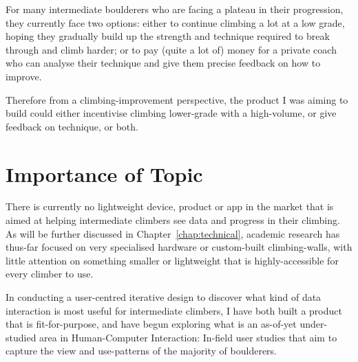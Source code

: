 For many intermediate boulderers who are facing a plateau in their progression, they currently face two options: either to continue climbing a lot at a low grade, hoping they gradually build up the strength and technique required to break through and climb harder; or to pay (quite a lot of) money for a private coach who can analyse their technique and give them precise feedback on how to improve.

Therefore from a climbing-improvement perspective, the product I was aiming to build could either incentivise climbing lower-grade with a high-volume, or give feedback on technique, or both.



\section{Importance of Topic}



There is currently no lightweight device, product or app in the market that is aimed at helping intermediate climbers see data and progress in their climbing.
As will be further discussed in Chapter~\ref{chap:technical}, academic research has thus-far focused on very specialised hardware or custom-built climbing-walls, with little attention on something smaller or lightweight that is highly-accessible for every climber to use.


In conducting a user-centred iterative design to discover what kind of data interaction is most useful for intermediate climbers, I have both built a product that is fit-for-purpose, and have begun exploring what is an as-of-yet under-studied area in Human-Computer Interaction:
In-field user studies that aim to capture the view and use-patterns of the majority of boulderers.



